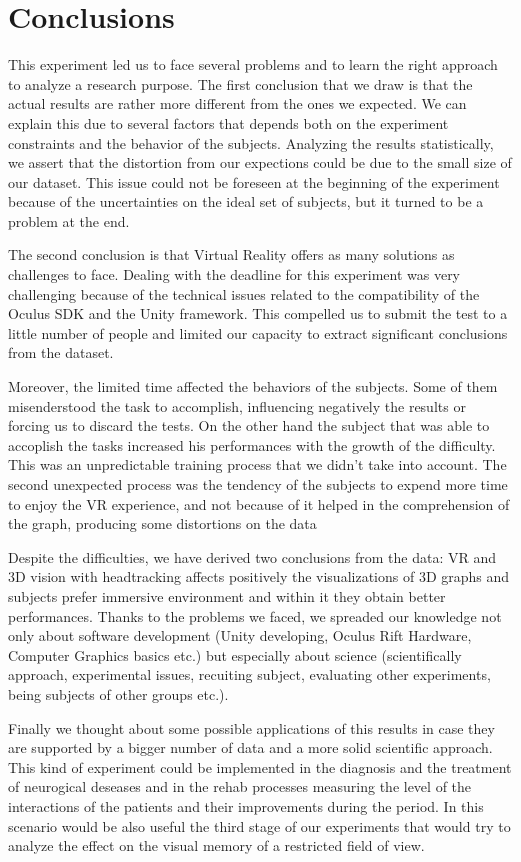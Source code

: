 \chapter{Conclusions}

This experiment led us to face several problems and to learn the right
approach to analyze a research purpose. The first conclusion that we
draw is that the actual results are rather more different from the ones
we expected. We can explain this due to several factors that depends
both on the experiment constraints and the behavior of the subjects.
Analyzing the results statistically, we assert that the distortion from
our expections could be due to the small size of our dataset. This issue
could not be foreseen at the beginning of the experiment because of the
uncertainties on the ideal set of subjects, but it turned to be a
problem at the end.

The second conclusion is that Virtual Reality offers as many solutions
as challenges to face. Dealing with the deadline for this experiment was
very challenging because of the technical issues related to the
compatibility of the Oculus SDK and the Unity framework. This compelled
us to submit the test to a little number of people and limited our
capacity to extract significant conclusions from the dataset.

Moreover, the limited time affected the behaviors of the subjects. Some
of them misenderstood the task to accomplish, influencing negatively the
results or forcing us to discard the tests. On the other hand the
subject that was able to accoplish the tasks increased his performances
with the growth of the difficulty. This was an unpredictable training
process that we didn't take into account. The second unexpected process
was the tendency of the subjects to expend more time to enjoy the VR
experience, and not because of it helped in the comprehension of the
graph, producing some distortions on the data

Despite the difficulties, we have derived two conclusions from the data:
VR and 3D vision with headtracking affects positively the visualizations
of 3D graphs and subjects prefer immersive environment and within it
they obtain better performances. Thanks to the problems we faced, we
spreaded our knowledge not only about software development (Unity
developing, Oculus Rift Hardware, Computer Graphics basics etc.) but
especially about science (scientifically approach, experimental issues,
recuiting subject, evaluating other experiments, being subjects of other
groups etc.).

Finally we thought about some possible applications of this results in
case they are supported by a bigger number of data and a more solid
scientific approach. This kind of experiment could be implemented in the
diagnosis and the treatment of neurogical deseases and in the rehab
processes measuring the level of the interactions of the patients and
their improvements during the period. In this scenario would be also
useful the third stage of our experiments that would try to analyze the
effect on the visual memory of a restricted field of view.





